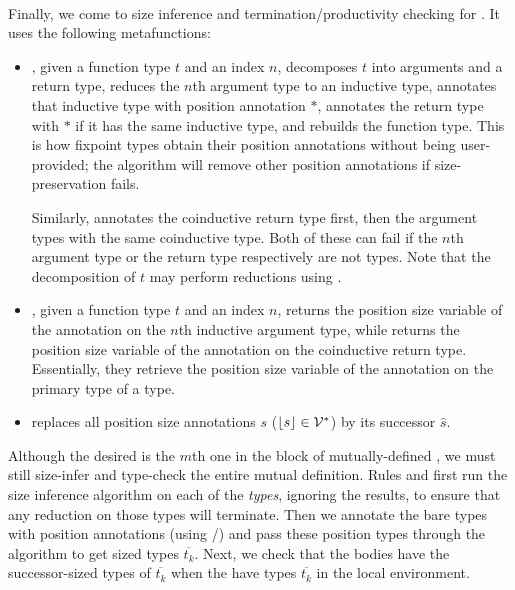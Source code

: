 \paragraph*{} Finally, we come to size inference and termination/productivity checking for \cofixpoints.
It uses the following metafunctions:
\begin{itemize}
  \item \setrecstars, given a function type $t$ and an index $n$, decomposes $t$ into arguments and a return type, reduces the $n$th argument type to an inductive type, annotates that inductive type with position annotation $*$, annotates the return type with $*$ if it has the same inductive type, and rebuilds the function type.
    This is how fixpoint types obtain their position annotations without being user-provided; the algorithm will remove other position annotations if size-preservation fails.

    Similarly, \setcorecstars annotates the coinductive return type first, then the argument types with the same coinductive type.
    Both of these can fail if the $n$th argument type or the return type respectively are not \coinductive types.
    Note that the decomposition of $t$ may perform reductions using \whnf.
  \item \getrecvar, given a function type $t$ and an index $n$, returns the position size variable of the annotation on the $n$th inductive argument type, while \getcorecvar returns the position size variable of the annotation on the coinductive return type.
    Essentially, they retrieve the position size variable of the annotation on the primary \corecursive type of a \cofixpoint type.
  \item \shift replaces all position size annotations $s$ (\ie $\lfloor s\rfloor \in \mathcal{V}^*$) by its successor $\hat{s}$.
\end{itemize}

Although the desired \cofixpoint is the $m$th one in the block of mutually-defined \cofixpoints, we must still size-infer and type-check the entire mutual definition.
Rules  and  first run the size inference algorithm on each of the \cofixpoint \emph{types}, ignoring the results, to ensure that any reduction on those types will terminate.
Then we annotate the bare types with position annotations (using \setrecstars/\setcorecstars) and pass these position types through the algorithm to get sized types $\overline{t_k}$.
Next, we check that the \cofixpoint bodies have the successor-sized types of $\overline{t_k}$ when the \cofixpoints have types $\overline{t_k}$ in the local environment.

